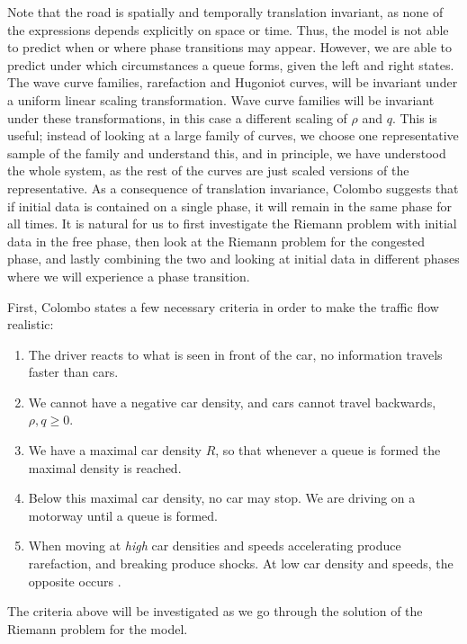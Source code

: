 \documentclass[10pt]{article}
\numberwithin{equation}{section}
\begin{document}
Note that the road is spatially and temporally translation invariant,  as none of the expressions depends explicitly on space or time. Thus, the model is not able to predict when or where phase transitions may appear. However, we are able to predict under which circumstances a queue forms, given the left and right states. The wave curve families, rarefaction and Hugoniot curves, will be invariant under a uniform linear scaling transformation. 
Wave curve families will be invariant under these transformations, in this case a different scaling of $\rho$ and $q$. This is useful; instead of looking at a  large family of curves, we choose one representative sample of the family and understand this, and in principle, we have understood the whole system, as the rest of the curves are just scaled versions of the representative. As a consequence of translation invariance, Colombo suggests that if initial data is contained on a single phase, it will remain in the same phase for all times. It is natural for us to first investigate the Riemann problem with initial data in the free phase, then look at the Riemann problem for the congested phase, and lastly combining the two and looking at initial data in different phases where we will experience a phase transition.

First, Colombo states a few necessary criteria in order to make the traffic flow realistic:
\begin{enumerate}
    \item The driver reacts to what is seen in front of the car, no information travels faster than cars.
    \item We cannot have a negative car density, and cars cannot travel backwards, $\rho, q \geq 0$.
    \item We have a maximal car density $R$, so that whenever a queue is formed the maximal density is reached. 
    \item Below this maximal car density, no car may stop. We are driving on a motorway until a  queue is formed. 
    \item When moving at \textit{high} car densities and speeds accelerating produce rarefaction, and breaking produce shocks. At low car density and speeds, the opposite occurs \cite{Colombo2002}. 
\end{enumerate} The criteria above will be investigated as we go through the solution of the Riemann problem for the model. 
\end{document}
